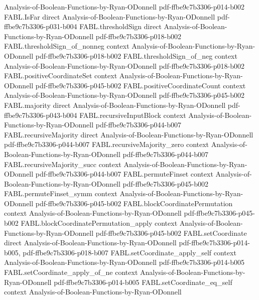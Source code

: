 \begin{theorem}
  {Analysis-of-Boolean-Functions-by-Ryan-ODonnell}
  {pdf-ffbe9c7b3306-p014-b002}
\proofstep
  {FABL.IsFar}
  {direct}
  {Analysis-of-Boolean-Functions-by-Ryan-ODonnell}
  {pdf-ffbe9c7b3306-p031-b004}
\proofstep
  {FABL.thresholdSign}
  {direct}
  {Analysis-of-Boolean-Functions-by-Ryan-ODonnell}
  {pdf-ffbe9c7b3306-p018-b002}
\proofstep
  {FABL.thresholdSign_of_nonneg}
  {context}
  {Analysis-of-Boolean-Functions-by-Ryan-ODonnell}
  {pdf-ffbe9c7b3306-p018-b002}
\proofstep
  {FABL.thresholdSign_of_neg}
  {context}
  {Analysis-of-Boolean-Functions-by-Ryan-ODonnell}
  {pdf-ffbe9c7b3306-p018-b002}
\proofstep
  {FABL.positiveCoordinateSet}
  {context}
  {Analysis-of-Boolean-Functions-by-Ryan-ODonnell}
  {pdf-ffbe9c7b3306-p045-b002}
\proofstep
  {FABL.positiveCoordinateCount}
  {context}
  {Analysis-of-Boolean-Functions-by-Ryan-ODonnell}
  {pdf-ffbe9c7b3306-p045-b002}
\proofstep
  {FABL.majority}
  {direct}
  {Analysis-of-Boolean-Functions-by-Ryan-ODonnell}
  {pdf-ffbe9c7b3306-p043-b004}
\proofstep
  {FABL.recursiveInputBlock}
  {context}
  {Analysis-of-Boolean-Functions-by-Ryan-ODonnell}
  {pdf-ffbe9c7b3306-p044-b007}
\proofstep
  {FABL.recursiveMajority}
  {direct}
  {Analysis-of-Boolean-Functions-by-Ryan-ODonnell}
  {pdf-ffbe9c7b3306-p044-b007}
\proofstep
  {FABL.recursiveMajority_zero}
  {context}
  {Analysis-of-Boolean-Functions-by-Ryan-ODonnell}
  {pdf-ffbe9c7b3306-p044-b007}
\proofstep
  {FABL.recursiveMajority_succ}
  {context}
  {Analysis-of-Boolean-Functions-by-Ryan-ODonnell}
  {pdf-ffbe9c7b3306-p044-b007}
\proofstep
  {FABL.permuteFinset}
  {context}
  {Analysis-of-Boolean-Functions-by-Ryan-ODonnell}
  {pdf-ffbe9c7b3306-p045-b002}
\proofstep
  {FABL.permuteFinset_symm}
  {context}
  {Analysis-of-Boolean-Functions-by-Ryan-ODonnell}
  {pdf-ffbe9c7b3306-p045-b002}
\proofstep
  {FABL.blockCoordinatePermutation}
  {context}
  {Analysis-of-Boolean-Functions-by-Ryan-ODonnell}
  {pdf-ffbe9c7b3306-p045-b002}
\proofstep
  {FABL.blockCoordinatePermutation_apply}
  {context}
  {Analysis-of-Boolean-Functions-by-Ryan-ODonnell}
  {pdf-ffbe9c7b3306-p045-b002}
\proofstep
  {FABL.setCoordinate}
  {direct}
  {Analysis-of-Boolean-Functions-by-Ryan-ODonnell}
  {pdf-ffbe9c7b3306-p014-b005,
    pdf-ffbe9c7b3306-p018-b007}
\proofstep
  {FABL.setCoordinate_apply_self}
  {context}
  {Analysis-of-Boolean-Functions-by-Ryan-ODonnell}
  {pdf-ffbe9c7b3306-p014-b005}
\proofstep
  {FABL.setCoordinate_apply_of_ne}
  {context}
  {Analysis-of-Boolean-Functions-by-Ryan-ODonnell}
  {pdf-ffbe9c7b3306-p014-b005}
\proofstep
  {FABL.setCoordinate_eq_self}
  {context}
  {Analysis-of-Boolean-Functions-by-Ryan-ODonnell}

\end{theorem}
